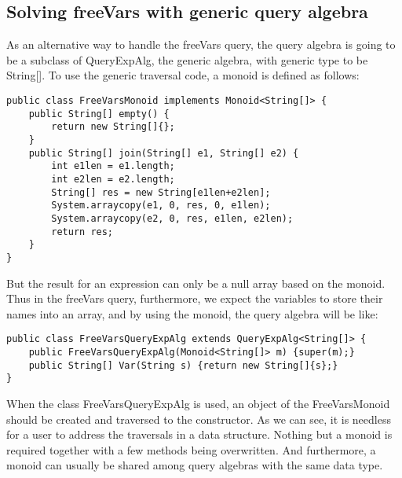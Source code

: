 \subsection{Solving freeVars with generic query algebra}\label{subsec:solvingfreevars}

As an alternative way to handle the freeVars query, the query algebra is going to be a subclass of QueryExpAlg, the generic algebra, with generic type to be String[]. To use the generic traversal code, a monoid is defined as follows:

\begin{lstlisting}[numbers=none]
public class FreeVarsMonoid implements Monoid<String[]> {
    public String[] empty() {
        return new String[]{};
    }
    public String[] join(String[] e1, String[] e2) {
        int e1len = e1.length;
        int e2len = e2.length;
        String[] res = new String[e1len+e2len];
        System.arraycopy(e1, 0, res, 0, e1len);
        System.arraycopy(e2, 0, res, e1len, e2len);
        return res;
    }
}
\end{lstlisting}

But the result for an expression can only be a null array based on the monoid. Thus in the freeVars query, furthermore, we expect the variables to store their names into an array, and by using the monoid, the query algebra will be like:

\begin{lstlisting}[numbers=none]
public class FreeVarsQueryExpAlg extends QueryExpAlg<String[]> {
    public FreeVarsQueryExpAlg(Monoid<String[]> m) {super(m);}
    public String[] Var(String s) {return new String[]{s};}
}
\end{lstlisting}

When the class FreeVarsQueryExpAlg is used, an object of the FreeVarsMonoid should be created and traversed to the constructor. As we can see, it is needless for a user to address the traversals in a data structure. Nothing but a monoid is required together with a few methods being overwritten. And furthermore, a monoid can usually be shared among query algebras with the same data type. 





